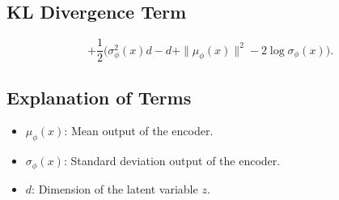 \subsection*{KL Divergence Term}
\[
+ \frac{1}{2} \Big(\sigma_\phi^2(x)d - d + \|\mu_\phi(x)\|^2 - 2 \log \sigma_\phi(x) \Big).
\]

\subsection*{Explanation of Terms}
\begin{itemize}
    \item \( \mu_\phi(x) \): Mean output of the encoder.
    \item \( \sigma_\phi(x) \): Standard deviation output of the encoder.
    \item \( d \): Dimension of the latent variable \(z\).
\end{itemize}
